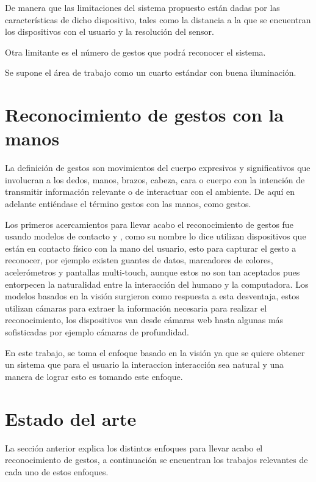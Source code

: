 De  manera que las limitaciones del sistema propuesto están dadas por las características de dicho dispositivo, tales como la distancia  a la que se encuentran los dispositivos con el usuario y la resolución del sensor. 

Otra limitante es el número de gestos que podrá reconocer el sistema.

Se supone el área de trabajo como un cuarto estándar con buena iluminación.




\section{Reconocimiento de gestos con la manos}\label{sec:ReconocimientoGestos} 

La definición de gestos \citep{Mitra2007} son movimientos del cuerpo expresivos y significativos que involucran a los dedos, manos, brazos, cabeza, cara o cuerpo con la intención de transmitir información relevante o de interactuar con el ambiente. De aquí en adelante entiéndase el término gestos con las manos, como gestos. 

Los primeros acercamientos para llevar acabo el reconocimiento de gestos fue usando modelos de contacto \citep{Rautaray2012} y \citep{Nayakwadi2014}, como su nombre lo dice utilizan dispositivos que est\'an en contacto f\'isico con la mano del usuario, esto para capturar el gesto a reconocer, por ejemplo existen guantes de datos, marcadores de colores, acelerómetros y pantallas multi-touch, aunque estos no son tan aceptados pues entorpecen la naturalidad entre la interacción del humano y la computadora. Los modelos basados en la visi\'on surgieron como respuesta a esta desventaja, estos utilizan cámaras para extraer la información necesaria para realizar el reconocimiento, los dispositivos van desde c\'amaras web hasta algunas más sofisticadas por ejemplo c\'amaras de profundidad.  

En este trabajo, se toma el enfoque basado en la visi\'on ya que se quiere obtener un sistema que para el usuario la interaccion interacción sea natural y una manera de lograr esto es tomando este enfoque.  



\section{Estado del arte}\label{sec:EstadoDelArte} 

La sección anterior explica los distintos enfoques para llevar acabo el reconocimiento de gestos, a continuación se encuentran los trabajos relevantes de cada uno de estos enfoques. 

